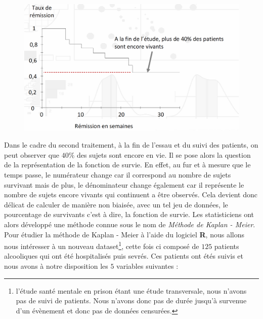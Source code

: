 \begin{figure}[H]\begin{center}\includegraphics[scale=0.5]{ilu/dsurv2.png}\end{center}\end{figure}
Dans le cadre du second traitement, à la fin de l'essau et du suivi des patients, on peut observer que $40\%$ des sujets sont encore en vie. Il se pose  alors la question de la représentation de la fonction de survie.\newline
En effet, au fur et à mesure que le temps passe, le numérateur change car il correspond au nombre de sujets survivant mais de plus, le dénominateur change également car il représente le nombre de sujets encore vivants qui continuent a être observés. Cela devient donc délicat de calculer de manière non biaisée, avec un tel jeu de données, le pourcentage de survivants c'est à dire, la fonction de survie.\newline
Les statisticiens ont alors développé une méthode connue sous le nom de \textit{Méthode de Kaplan - Meier}.\newline
\\
Pour étudier la méthode de Kaplan - Meier à l'aide du logiciel \textbf{R}, nous allons nous intéresser à un nouveau dataset\footnote{l'étude santé mentale en
prison étant une étude transversale, nous n'avons pas de suivi de patients. Nous n'avons donc pas de durée jusqu'à survenue d'un évènement et donc pas de données censurées.}, cette fois ci composé de $125$ patients alcooliques qui ont été hospitalisés puis sevrés. Ces patients ont étés suivis et nous avons à notre disposition les $5$ variables suivantes : 
